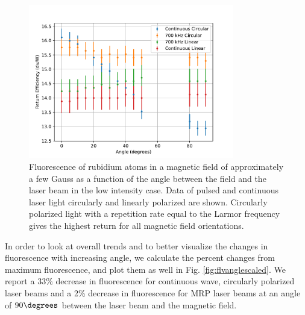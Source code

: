 \begin{figure}[htb]
	\centering
	\includegraphics[width=0.8\textwidth]{../../MRPData/April16/together.pdf}
	\caption{Fluorescence of rubidium atoms in a magnetic field of approximately a few Gauss as a function of the angle between the field and the laser beam in the low intensity case. Data of pulsed and continuous laser light circularly and linearly polarized are shown. Circularly polarized light with a repetition rate equal to the Larmor frequency gives the highest return for all magnetic field orientations.}
	\label{fig:flvangle2}
\end{figure}

In order to look at overall trends and to better visualize the changes in fluorescence with increasing angle, we calculate the percent changes from maximum fluorescence, and plot them as well in Fig. \ref{fig:flvanglescaled}. We report a 33\% decrease in fluorescence for continuous wave, circularly polarized laser beams and a 2\% decrease in fluorescence for MRP laser beams at an angle of $90 \degrees$ between the laser beam and the magnetic field.

